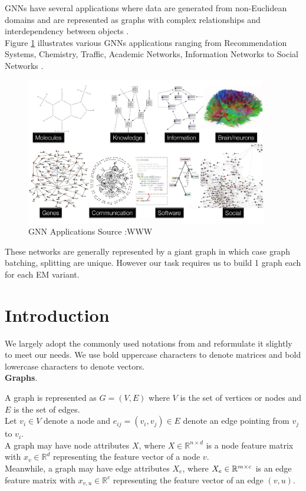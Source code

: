 \documentclass{report} %
\begin{document}
\ac{GNN}s have several applications where data are generated from non-Euclidean domains and are represented as graphs with complex relationships and interdependency between objects \cite{GNN-2019}.\\
Figure \ref{fig:GNN Applications} illustrates various \ac{GNN}s applications ranging from Recommendation Systems, Chemistry, Traffic, Academic Networks, Information Networks to Social Networks \cite{HGNN-2020}.\\

\begin{figure}[H]
    \centering
    \includegraphics[width=0.95\textwidth]{./ReportImages/GraphApplications.png} 
    \caption{\ac{GNN} Applications Source :WWW}
    \label{fig:GNN Applications}
\end{figure}

These networks are generally represented by a giant graph in which case graph batching, splitting are unique.
However our task requires us to build 1 graph each for each \ac{EM} variant.

\section{Introduction}\label{sec:Introduction}

We largely adopt the commonly used notations from \cite{GNN-2019} and reformulate it slightly to meet our needs.
We use bold uppercase characters to denote matrices and bold lowercase characters to denote vectors.\\

\textbf{Graphs}. 

A graph is represented as \( G = (V, E) \) where \( V \) is the set of vertices or nodes  and \( E \) is the set of edges. \\
Let \( v_i \in V \) denote a node and \( e_{ij} = (v_i, v_j) \in E \) denote an edge pointing from \( v_j \) to \( v_i \). \\
A graph may have node attributes \( X \), where \( X \in \mathbb{R}^{n \times d} \) is a node feature matrix with 
\( x_v \in \mathbb{R}^d \) representing the feature vector of a node \( v \). \\
Meanwhile, a graph may have edge attributes \( X_e \), where \( X_e \in \mathbb{R}^{m \times \\c} \) is an edge
feature matrix with \( x_{v,u} \in \mathbb{R}^c \) representing the feature vector of an edge \( (v, u) \).\\
\end{document}
